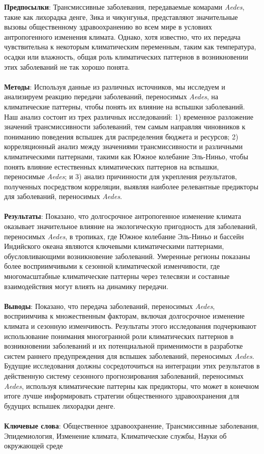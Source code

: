 \documentclass[10pt]{article}
\begin{document}
\textbf{Предпосылки}: Трансмиссивные заболевания, передаваемые комарами \textit{Aedes}, такие как лихорадка денге, Зика и чикунгунья, представляют значительные вызовы общественному здравоохранению во всем мире в условиях антропогенного изменения климата. Однако, хотя известно, что их передача чувствительна к некоторым климатическим переменным, таким как температура, осадки или влажность, общая роль климатических паттернов в возникновении этих заболеваний не так хорошо понята.
\\
\\
\textbf{Методы}: Используя данные из различных источников, мы исследуем и анализируем реакцию передачи заболеваний, переносимых \textit{Aedes}, на климатические паттерны, чтобы понять их влияние на вспышки заболеваний. Наш анализ состоит из трех различных исследований: 1) временное разложение значений трансмиссивности заболеваний, тем самым направляя чиновников к пониманию поведения вспышек для распределения бюджета и ресурсов; 2) корреляционный анализ между значениями трансмиссивности и различными климатическими паттернами, такими как Южное колебание Эль-Ниньо, чтобы понять влияние естественных климатических паттернов на вспышки, переносимые \textit{Aedes}; и 3) анализ причинности для укрепления результатов, полученных посредством корреляции, выявляя наиболее релевантные предикторы для заболеваний, переносимых \textit{Aedes}.
\\
\\
\textbf{Результаты}: Показано, что долгосрочное антропогенное изменение климата оказывает значительное влияние на экологическую пригодность для заболеваний, переносимых \textit{Aedes}, в тропиках, где Южное колебание Эль-Ниньо и бассейн Индийского океана являются ключевыми климатическими паттернами, обусловливающими возникновение заболеваний. Умеренные регионы показаны более восприимчивыми к сезонной климатической изменчивости, где многомасштабные климатические паттерны через телесвязи и составные взаимодействия могут влиять на динамику передачи.
\\
\\
\textbf{Выводы}: Показано, что передача заболеваний, переносимых \textit{Aedes}, восприимчива к множественным факторам, включая долгосрочное изменение климата и сезонную изменчивость. Результаты этого исследования подчеркивают использование понимания многогранной роли климатических паттернов в возникновении заболеваний и их потенциальной применимости в разработке систем раннего предупреждения для вспышек заболеваний, переносимых \textit{Aedes}. Будущие исследования должны сосредоточиться на интеграции этих результатов в действенную систему сезонного прогнозирования заболеваний, переносимых \textit{Aedes}, используя климатические паттерны как предикторы, что может в конечном итоге лучше информировать стратегии общественного здравоохранения для будущих вспышек лихорадки денге.
\\
\\
\textbf{Ключевые слова}: Общественное здравоохранение, Трансмиссивные заболевания, Эпидемиология, Изменение климата, Климатические службы, Науки об окружающей среде

\newpage
\end{document}
